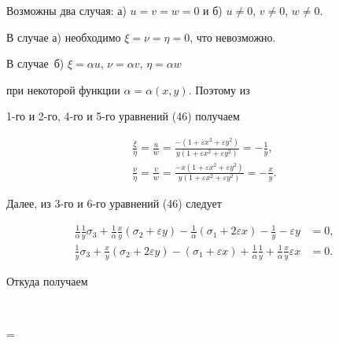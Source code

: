  


Возможны два случая: а) $u=v=w=0$ и б) $u\ne0$, $v\ne0$, $w\ne0$. 


 


В случае а) необходимо $\xi=\nu=\eta=0$, что невозможно. 


В случае~б) $\xi=\alpha u$, $\nu=\alpha v$, $\eta=\alpha w$ 


при некоторой функции $\alpha=\alpha(x,y)$. Поэтому из 


1-го и 2-го, 4-го и 5-го уравнений (46) получаем 


\begin{gather*} 


\frac{\xi}{\eta}=\frac{u}{w}= 


\frac{-(1+\varepsilon x^2+\varepsilon y^2)} 


{y(1+\varepsilon x^2+\varepsilon y^2)}=-\frac{1}{y},\\ 


% 


\frac{\nu}{\eta}=\frac{v}{w}= 


\frac{-x(1+\varepsilon x^2+\varepsilon y^2)} 


{y(1+\varepsilon x^2+\varepsilon y^2)}=-\frac{x}{y}.


\end{gather*} 


 


Далее, из 3-го и 6-го уравнений (46) следует 


\begin{align*} 


\frac{1}{\alpha}\frac{1}{y}\sigma_3+\frac{1}{\alpha} 


\frac{x}{y}(\sigma_2+\varepsilon y)-\frac{1}{\alpha} 


(\sigma_1+2\varepsilon x)-\frac{1}{y}-\varepsilon y&=0,\\ 


% 


\frac{1}{y}\sigma_3+\frac{x}{y}(\sigma_2+2\varepsilon y)- 


(\sigma_1+\varepsilon x)+\frac{1}{\alpha}\frac{1}{y} 


+\frac{1}{\alpha}\frac{x}{y}\varepsilon x&=0. 


\end{align*} 


Откуда получаем 


$$ 


= 


